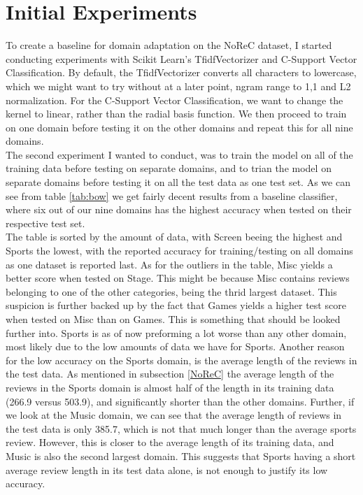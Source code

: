\section{Initial Experiments}
To create a baseline for domain adaptation on the NoReC dataset, I started conducting experiments with Scikit Learn's TfidfVectorizer and C-Support Vector Classification. By default, the TfidfVectorizer converts all characters to lowercase, which we might want to try without at a later point, ngram range to 1,1 and L2 normalization. For the C-Support Vector Classification, we want to change the kernel to linear, rather than the radial basis function. We then proceed to train on one domain before testing it on the other domains and repeat this for all nine domains.\\
The second experiment I wanted to conduct, was to train the model on all of the training data before testing on separate domains, and to trian the model on separate domains before testing it on all the test data as one test set. As we can see from table \ref{tab:bow} we get fairly decent results from a baseline classifier, where six out of our nine domains has the highest accuracy when tested on their respective test set.\\
The table is sorted by the amount of data, with Screen beeing the highest and Sports the lowest, with the reported accuracy for training/testing on all domains as one dataset is reported last. As for the outliers in the table, Misc yields a better score when tested on Stage. This might be because Misc contains reviews belonging to one of the other categories, being the thrid largest dataset. This suspicion is further backed up by the fact that Games yields a higher test score when tested on Misc than on Games. This is something that should be looked further into. Sports is as of now preforming a lot worse than any other domain, most likely due to the low amounts of data we have for Sports. Another reason for the low accuracy on the Sports domain, is the average length of the reviews in the test data. As mentioned in subsection \ref{NoReC} the average length of the reviews in the Sports domain is almost half of the length in its training data (266.9 versus 503.9), and significantly shorter than the other domains. Further, if we look at the Music domain, we can see that the average length of reviews in the test data is only 385.7, which is not that much longer than the average sports review. However, this is closer to the average length of its training data, and Music is also the second largest domain. This suggests that Sports having a short average review length in its test data alone, is not enough to justify its low accuracy. \\

